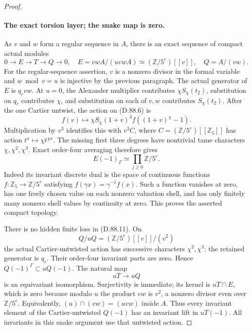 \begin{proof}
\paragraph{The exact torsion layer; the snake map is zero.}
As \(v\) and \(w\) form a regular sequence in \(A\),
there is an exact sequence of compact actual modules
\[
 0\longrightarrow E\longrightarrow T\longrightarrow Q
      \longrightarrow0,
 \quad E=vwA/(uvwA)\simeq(\mathbb Z/5^e)[[v]],
 \quad Q=A/(vw).                                      \tag{D.88.9}
\]
For the regular-sequence assertion, \(v\) is a nonzero
 divisor in the formal variable and \(w\bmod v=u\) is
injective by the previous paragraph. The actual generator of
\(E\) is \(q_rvw\). At \(u=0\), the Alexander multiplier
contributes \(\chi S_\chi(t_2)\), substitution on \(q_r\)
contributes \(\chi\), and substitution on each of \(v,w\)
contributes \(S_\chi(t_2)\). After the one Cartier untwist,
the action on (D.88.6) is
\[
 f(v)\longmapsto\chi S_\chi(1+v)^3
                         f((1+v)^\chi-1).             \tag{D.88.10}
\]
Multiplication by \(v^3\) identifies this with
\(v^3C\), where \(C=(\mathbb Z/5^e)[[\mathbb Z_5]]\)
has action \(t^x\mapsto\chi t^{\chi x}\).
The missing first three degrees have nontrivial tame
characters \(\chi,\chi^2,\chi^3\). Exact order-four
averaging therefore gives
\[
                     E(-1)_\Gamma\simeq
                           \prod_{j\ge0}\mathbb Z/5^e.
                                                               \tag{D.88.11}
\]
Indeed its invariant discrete dual is the space of continuous
functions \(f:\mathbb Z_5\to\mathbb Z/5^e\) satisfying
\(f(\gamma x)=\gamma^{-1}f(x)\). Such a function vanishes
at zero, has one freely chosen value on each nonzero valuation
shell, and has only finitely many nonzero shell values by
continuity at zero. This proves the asserted compact topology.

There is no hidden finite loss in (D.88.11). On
\[
             Q/uQ=(\mathbb Z/5^e)[[v]]/(v^2)
\]
the actual Cartier-untwisted action has successive characters
\(\chi^2,\chi^3\): the retained generator is \(q_r\).
Their order-four invariant parts are zero. Hence
\(Q(-1)^\Gamma\subset uQ(-1)\). The natural map
\[
                              uT\longrightarrow uQ
                                                               \tag{D.88.12}
\]
is an equivariant isomorphism. Surjectivity is immediate;
its kernel is \(uT\cap E\), which is zero because modulo
\(u\) the product \(vw\) is \(v^2\), a nonzero divisor
even over \(\mathbb Z/5^e\). Equivalently,
\((u)\cap(vw)=(uvw)\) inside \(A\).
Thus every invariant element of the Cartier-untwisted
\(Q(-1)\) has an invariant lift in \(uT(-1)\). All
invariants in this snake argument use that untwisted action.


\end{proof}
